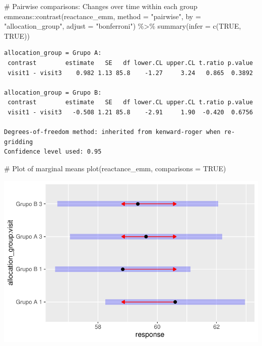 \documentclass[
  letterpaper,
  DIV=11,
  numbers=noendperiod]{scrartcl}
\newenvironment{Shaded}{\begin{snugshade}}{\end{snugshade}}
\newcommand{\AttributeTok}[1]{\textcolor[rgb]{0.40,0.45,0.13}{#1}}
\newcommand{\CommentTok}[1]{\textcolor[rgb]{0.37,0.37,0.37}{#1}}
\newcommand{\ConstantTok}[1]{\textcolor[rgb]{0.56,0.35,0.01}{#1}}
\newcommand{\FunctionTok}[1]{\textcolor[rgb]{0.28,0.35,0.67}{#1}}
\newcommand{\NormalTok}[1]{\textcolor[rgb]{0.00,0.23,0.31}{#1}}
\newcommand{\SpecialCharTok}[1]{\textcolor[rgb]{0.37,0.37,0.37}{#1}}
\newcommand{\StringTok}[1]{\textcolor[rgb]{0.13,0.47,0.30}{#1}}
\begin{document}
\begin{Shaded}
\begin{Highlighting}[]
\CommentTok{\# Pairwise comparisons: Changes over time within each group}
\NormalTok{emmeans}\SpecialCharTok{::}\FunctionTok{contrast}\NormalTok{(reactance\_emm, }\AttributeTok{method =} \StringTok{"pairwise"}\NormalTok{, }\AttributeTok{by =} \StringTok{"allocation\_group"}\NormalTok{, }\AttributeTok{adjust =} \StringTok{"bonferroni"}\NormalTok{) }\SpecialCharTok{\%\textgreater{}\%} \FunctionTok{summary}\NormalTok{(}\AttributeTok{infer =} \FunctionTok{c}\NormalTok{(}\ConstantTok{TRUE}\NormalTok{, }\ConstantTok{TRUE}\NormalTok{))}
\end{Highlighting}
\end{Shaded}

\begin{verbatim}
allocation_group = Grupo A:
 contrast        estimate   SE   df lower.CL upper.CL t.ratio p.value
 visit1 - visit3    0.982 1.13 85.8    -1.27     3.24   0.865  0.3892

allocation_group = Grupo B:
 contrast        estimate   SE   df lower.CL upper.CL t.ratio p.value
 visit1 - visit3   -0.508 1.21 85.8    -2.91     1.90  -0.420  0.6756

Degrees-of-freedom method: inherited from kenward-roger when re-gridding 
Confidence level used: 0.95 
\end{verbatim}

\begin{Shaded}
\begin{Highlighting}[]
\CommentTok{\# Plot of marginal means}
\FunctionTok{plot}\NormalTok{(reactance\_emm, }\AttributeTok{comparisons =} \ConstantTok{TRUE}\NormalTok{)}
\end{Highlighting}
\end{Shaded}

\includegraphics{Outcomes_V1V2V3_files/figure-pdf/reactance_sens_emm-1.pdf}
\end{document}
